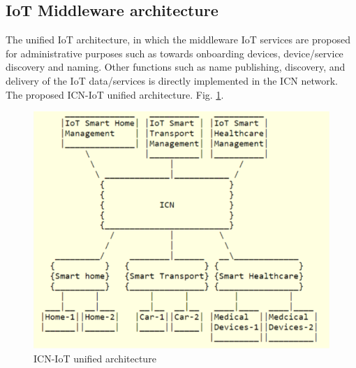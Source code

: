 \subsection{IoT Middleware architecture}
The unified IoT architecture, in which the middleware IoT services are proposed for administrative purposes such as towards onboarding devices, device/service discovery and naming. Other functions such as name publishing, discovery, and delivery of the IoT data/services is directly implemented in the ICN network.
The proposed ICN-IoT unified architecture. Fig. 
 \ref{fig:archi}.
 \begin{figure}[h]
	\centering
	\includegraphics[width=0.8\linewidth]{Figures/archi.png}
	\caption[]{ICN-IoT unified architecture}
	\label{fig:archi}
\end{figure}
\par

